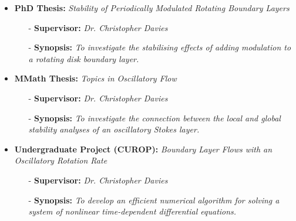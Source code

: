 \documentclass[10pt,a4paper,sans]{moderncv}        %
\begin{document}
	\begin{itemize}
		
		\item{\textbf{PhD Thesis:} \textit{Stability of Periodically Modulated Rotating Boundary Layers}		
			
			\vspace{3pt}
			
			\begin{itemize}
				\item [-] \small{\textbf{Supervisor:} \textit{Dr. Christopher Davies}}
				\item [-] \small{\textbf{Synopsis:} \textit{To investigate the stabilising effects of adding modulation to a rotating disk boundary layer.}}
			\end{itemize}														
		}
	
		\vspace{10pt}
		
		\item{\textbf{MMath Thesis:} \textit{Topics in Oscillatory Flow}		
			
			\vspace{3pt}
			
			\begin{itemize}
				\item [-] \small{\textbf{Supervisor:} \textit{Dr. Christopher Davies}}
				\item [-] \small{\textbf{Synopsis:} \textit{To investigate the connection between the local and global stability analyses of an oscillatory Stokes layer.}}
			\end{itemize}														
		}
		
		\vspace{10pt}
	
		\item{\textbf{Undergraduate Project (CUROP):} \textit{Boundary Layer Flows with an Oscillatory Rotation Rate}		
			
			\vspace{3pt}
			
			\begin{itemize}
				\item [-] \small{\textbf{Supervisor:} \textit{Dr. Christopher Davies}}
				\item [-] \small{\textbf{Synopsis:} \textit{To develop an efficient numerical algorithm for solving a system of nonlinear time-dependent differential equations.}}
			\end{itemize}														
		}
		
	\end{itemize}
	
\end{document}
